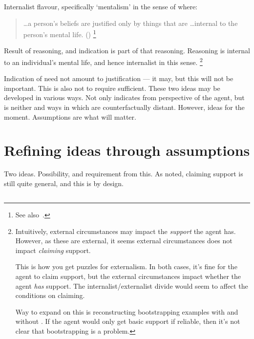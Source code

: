\begin{note}
  Internalist flavour, specifically `mentalism' in the sense of \citeauthor{Feldman:2001uy} where:
  \begin{quote}
    \dots a person's beliefs are justified only by things that are \dots internal to the person's mental life.\nolinebreak
    \mbox{}\hfill\mbox{(\citeyear[233]{Feldman:2001uy})}\nolinebreak
    \footnote{
      See also~\textcite[\S4,9]{Pappas:2017vi}.
    }
  \end{quote}
  Result of reasoning, and indication is part of that reasoning.
  Reasoning is internal to an individual's mental life, and hence internalist in this sense.\nolinebreak
  \footnote{
    \color{red}
    Intuitively, external circumstances may impact the \emph{support} the agent has.
    However, as these are external, it seems external circumstances does not impact \emph{claiming} support.

    This is how you get puzzles for externalism.
    In both cases, it's fine for the agent to claim support, but the external circumstances impact whether the agent \emph{has} support.
    The internalist/externalist divide would seem to affect the conditions on claiming.

    Way to expand on this is reconstructing bootstrapping examples with and without \eiS{}.
    If the agent would only get basic support if reliable, then it's not clear that bootstrapping is a problem.
  }

  Indication of \ideaCSB{} need not amount to justification --- it may, but this will not be important.
  This is also not to require sufficient.
  These two ideas may be developed in various ways.
  Not only indicates from perspective of the agent, but is neither \mom{} and ways in which \mom{} are counterfactually distant.
  However, ideas for the moment.
  Assumptions are what will matter.
\end{note}

\section{Refining ideas through assumptions}
\label{sec:assumpt-from-ideas}

\begin{note}
  Two ideas.
  Possibility, and requirement from this.
  As noted, claiming support is still quite general, and this is by design.
\end{note}

\subsection{}
\label{sec:claim-supp-requ}

